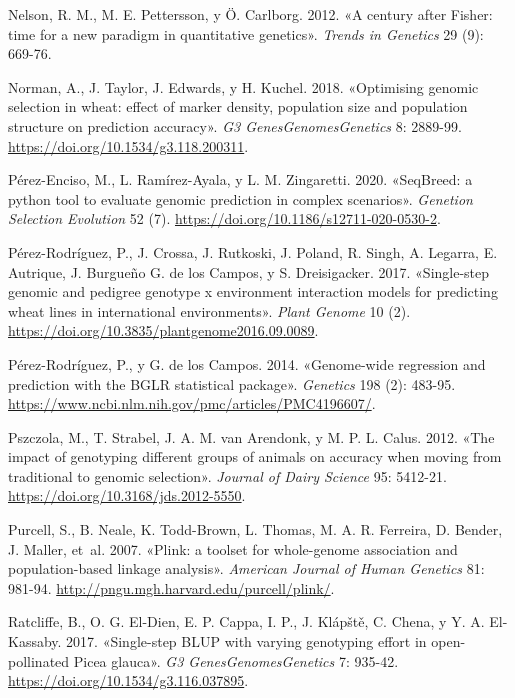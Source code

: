 \documentclass[11pt,spanish,a4paper,oneside,]{book} %
\begin{document}
\leavevmode\hypertarget{ref-cite:2}{}%
Nelson, R. M., M. E. Pettersson, y Ö. Carlborg. 2012. «A century after Fisher: time for a new paradigm in quantitative genetics». \emph{Trends in Genetics} 29 (9): 669-76.

\leavevmode\hypertarget{ref-cite:78}{}%
Norman, A., J. Taylor, J. Edwards, y H. Kuchel. 2018. «Optimising genomic selection in wheat: effect of marker density, population size and population structure on prediction accuracy». \emph{G3 Genes\textbar{}Genomes\textbar{}Genetics} 8: 2889-99. \url{https://doi.org/10.1534/g3.118.200311}.

\leavevmode\hypertarget{ref-cite:47}{}%
Pérez-Enciso, M., L. Ramírez-Ayala, y L. M. Zingaretti. 2020. «SeqBreed: a python tool to evaluate genomic prediction in complex scenarios». \emph{Genetion Selection Evolution} 52 (7). \url{https://doi.org/10.1186/s12711-020-0530-2}.

\leavevmode\hypertarget{ref-cite:19}{}%
Pérez-Rodríguez, P., J. Crossa, J. Rutkoski, J. Poland, R. Singh, A. Legarra, E. Autrique, J. Burgueño G. de los Campos, y S. Dreisigacker. 2017. «Single-step genomic and pedigree genotype x environment interaction models for predicting wheat lines in international environments». \emph{Plant Genome} 10 (2). \url{https://doi.org/10.3835/plantgenome2016.09.0089}.

\leavevmode\hypertarget{ref-cite:50}{}%
Pérez-Rodríguez, P., y G. de los Campos. 2014. «Genome-wide regression and prediction with the BGLR statistical package». \emph{Genetics} 198 (2): 483-95. \url{https://www.ncbi.nlm.nih.gov/pmc/articles/PMC4196607/}.

\leavevmode\hypertarget{ref-cite:74}{}%
Pszczola, M., T. Strabel, J. A. M. van Arendonk, y M. P. L. Calus. 2012. «The impact of genotyping different groups of animals on accuracy when moving from traditional to genomic selection». \emph{Journal of Dairy Science} 95: 5412-21. \url{https://doi.org/10.3168/jds.2012-5550}.

\leavevmode\hypertarget{ref-cite:49}{}%
Purcell, S., B. Neale, K. Todd-Brown, L. Thomas, M. A. R. Ferreira, D. Bender, J. Maller, et~al. 2007. «Plink: a toolset for whole-genome association and population-based linkage analysis». \emph{American Journal of Human Genetics} 81: 981-94. \url{http://pngu.mgh.harvard.edu/purcell/plink/}.

\leavevmode\hypertarget{ref-cite:72}{}%
Ratcliffe, B., O. G. El-Dien, E. P. Cappa, I. P., J. Klápště, C. Chena, y Y. A. El-Kassaby. 2017. «Single-step BLUP with varying genotyping effort in open-pollinated Picea glauca». \emph{G3 Genes\textbar{}Genomes\textbar{}Genetics} 7: 935-42. \url{https://doi.org/10.1534/g3.116.037895}.
\end{document}

